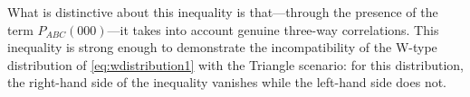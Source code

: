 {What is distinctive about this inequality is that---through the presence of the term $P_{ABC}(000)$---it takes into account genuine three-way correlations.  This inequality is strong enough to demonstrate the incompatibility of the W-type distribution of \cref{eq:wdistribution1} with the Triangle scenario: for this distribution, the right-hand side of the inequality vanishes while the left-hand side does not.

\bigskip



}
